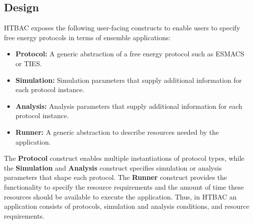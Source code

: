 


\subsection{Design}

HTBAC exposes the following user-facing constructs to enable users to specify
free energy protocols in terms of ensemble applications:

\begin{itemize}
  \item \textbf{Protocol:} A generic abstraction of a free energy protocol
  such as ESMACS or TIES.
  \item \textbf{Simulation:} Simulation parameters that supply 
  additional information for each protocol instance.
  \item \textbf{Analysis:} Analysis parameters that supply additional 
  information for each protocol instance. 
  \item \textbf{Runner:} A generic abstraction to describe resources needed
  by the application.
\end{itemize}

The \textbf{Protocol} construct enables multiple instantiations of protocol
types, while the \textbf{Simulation} and \textbf{Analysis} construct specifies 
simulation or analysis parameters that shape each protocol. The \textbf{Runner} 
construct provides the functionality to specify the resource requirements and 
the amount of time these resources should be available to execute the 
application. Thus, in HTBAC an application consists of protocols, simulation 
and analysis conditions, and resource requirements.

